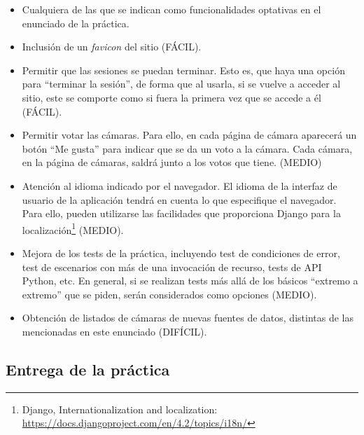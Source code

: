 \begin{itemize}
\item Cualquiera de las que se indican como funcionalidades optativas en el enunciado de la práctica.
  
\item Inclusión de un \emph{favicon} del sitio (FÁCIL).

\item Permitir que las sesiones se puedan terminar. Esto es, que haya una opción para ``terminar la sesión'', de forma que al usarla, si se vuelve a acceder al sitio, este se comporte como si fuera la primera vez que se accede a él (FÁCIL).

\item Permitir votar las cámaras. Para ello, en cada página de cámara aparecerá un botón ``Me gusta'' para indicar que se da un voto a la cámara. Cada cámara, en la página de cámaras, saldrá junto a los votos que tiene. (MEDIO)

\item Atención al idioma indicado por el navegador. El idioma de la interfaz de usuario de la aplicación tendrá en cuenta lo que especifique el navegador. Para ello, pueden utilizarse las facilidades que proporciona Django para la localización\footnote{Django, Internationalization and localization: \\ \url{https://docs.djangoproject.com/en/4.2/topics/i18n/} } (MEDIO).
    
\item Mejora de los tests de la práctica, incluyendo test de condiciones de error, test de escenarios con más de una invocación de recurso, tests de API Python, etc. En general, si se realizan tests más allá de los básicos ``extremo a extremo'' que se piden, serán considerados como opciones (MEDIO).

\item Obtención de listados de cámaras de nuevas fuentes de datos, distintas de las mencionadas en este enunciado (DIFÍCIL).
\end{itemize}

\subsection{Entrega de la práctica}

